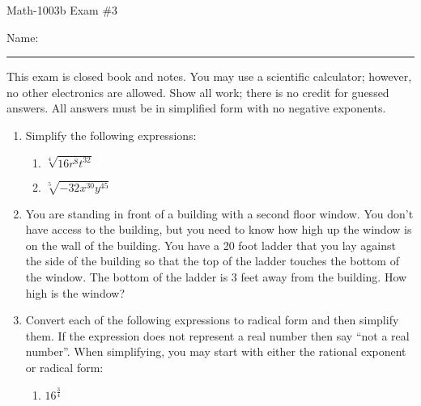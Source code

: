 \documentclass[letterpaper,12pt,fleqn]{article}
\begin{document}
\begin{center}
\Large Math-1003b Exam \#3
\end{center}

\vspace{0.5in}

Name: \rule{4in}{1pt}

\vspace{0.5in}

This exam is closed book and notes. You may use a scientific calculator; however, no
other electronics are allowed. Show all work; there is no credit for guessed answers. All
answers must be in simplified form with no negative exponents.

\vspace{0.25in}

\begin{enumerate}
\item Simplify the following expressions:
  \begin{enumerate}
  \item $\sqrt[4]{16r^8t^{32}}$

    \vspace{1in}
    
  \item $\sqrt[5]{-32x^{30}y^{45}}$

    \vspace{1in}
    
  \end{enumerate}

\item You are standing in front of a building with a second floor window. You don't
  have access to the building, but you need to know how high up the window is on the
  wall of the building. You have a 20 foot ladder that you lay against the side of the
  building so that the top of the ladder touches the bottom of the window. The bottom
  of the ladder is 3 feet away from the building. How high is the window?

  \newpage
  
\item Convert each of the following expressions to radical form and then simplify
  them. If the expression does not represent a real number then say
  ``not a real number''. When simplifying, you may start with either the rational
  exponent or radical form:
  \begin{enumerate}
  \item $16^{\frac{3}{4}}$

    \vspace{1in}
    

\end{enumerate}
\end{enumerate}
\end{document}

